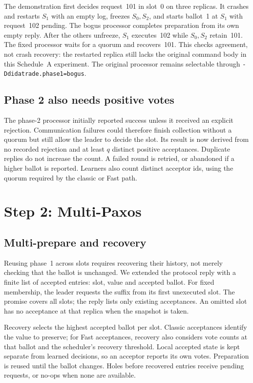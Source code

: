 \documentclass[times,10pt,twocolumn]{article}
\newcommand{\code}[1]{\texttt{\small #1}}
\begin{document}
The demonstration first decides request~101 in slot~0 on three replicas.
It crashes and restarts $S_1$ with an empty log, freezes $S_0,S_2$, and starts
ballot~1 at $S_1$ with request~102 pending. The bogus processor completes
preparation from its own empty reply. After the others unfreeze, $S_1$
executes~102 while $S_0,S_2$ retain~101. The fixed processor waits for a quorum
and recovers~101. This checks agreement, not crash recovery: the restarted
replica still lacks the original command body in this Schedule~A experiment.
The original processor remains selectable through
\code{-Ddidatrade.phase1=bogus}.

\subsection{Phase 2 also needs positive votes}
The phase-2 processor initially reported success unless it received an
explicit rejection. Communication failures could therefore finish collection
without a quorum but still allow the leader to decide the slot. Its result
is now derived from no recorded rejection and at least $q$ distinct positive
acceptances. Duplicate replies do not increase the count. A failed round
is retried, or abandoned if a higher ballot is reported. Learners also count
distinct acceptor ids, using the quorum required by the classic or Fast path.

\section{Step 2: Multi-Paxos}
\label{sec:step2}

\subsection{Multi-prepare and recovery}
Reusing phase~1 across slots requires recovering their history, not merely
checking that the ballot is unchanged. We extended the protocol reply with
a finite list of accepted entries: slot, value and accepted ballot.
For fixed membership, the leader requests the suffix from its first
unexecuted slot. The promise covers all slots; the reply lists only existing
acceptances. An omitted slot has no acceptance at that replica when the
snapshot is taken.

Recovery selects the highest accepted ballot per slot. Classic acceptances
identify the value to preserve; for Fast acceptances, recovery also considers
vote counts at that ballot and the scheduler's recovery threshold. Local
accepted state is kept separate from learned decisions, so an acceptor reports
its own votes. Preparation is reused until the ballot changes. Holes before
recovered entries receive pending requests, or no-ops when none are available.
\end{document}
